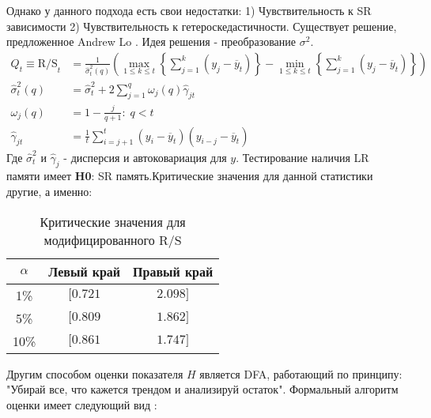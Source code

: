 Однако у данного подхода есть свои недостатки: 1) Чувствительность к SR зависимости 2) Чувствительность к гетероскедастичности. Существует решение, предложенное Andrew Lo \cite{andrew1991longterm}. Идея решения - преобразование $\sigma^2$.
\begin{equation}
	\begin{split}
		Q_t \equiv \text{R/S}_t & = \frac{1}{\hat{\sigma}^2_t(q)} \left(\max_{1 \le k \le t} \left\{\sum_{j = 1}^k (y_j - \overline{y}_t)\right\} - \min_{1 \le k \le t} \left\{\sum_{j = 1}^k (y_j - \overline{y}_t)\right\}\right)\\
		\hat{\sigma}^2_t(q) & = \hat{\sigma}^2_t + 2 \sum_{j = 1}^q \omega_j(q) \hat{\gamma}_{jt}\\
		\omega_j(q) & = 1 - \frac{j}{q + 1}: \; q < t\\
		\hat{\gamma}_{jt} & = \frac{1}{t} \sum_{i = j + 1}^t (y_i - \overline{y}_t)(y_{i - j} - \overline{y}_t)
	\end{split}
\end{equation}
Где $\hat{\sigma}^2_t$ и $\hat{\gamma}_j$ - дисперсия и автоковариация для $y$. Тестирование наличия LR памяти имеет \textbf{H0}: SR память.Критические значения для данной статистики другие, а именно:
\begin{table}[H]
	\centering
	\begin{tabular}{c|cc}
		\toprule
		$\alpha$ & Левый край & Правый край\\
		\midrule[0.02cm]
		1\% & $[0.721$ & $2.098]$\\
		5\% & $[0.809$ & $1.862]$\\
		10\% & $[0.861$ & $1.747]$\\
		\midrule[0.02cm]
	\end{tabular}
	\caption{Критические значения для модифицированного R/S}
\end{table}
\noindent Другим способом оценки показателя $H$ является DFA, работающий по принципу: "Убирай все, что кажется трендом и анализируй остаток". Формальный алгоритм оценки имеет следующий вид \cite{garafutdinov2021research}:
